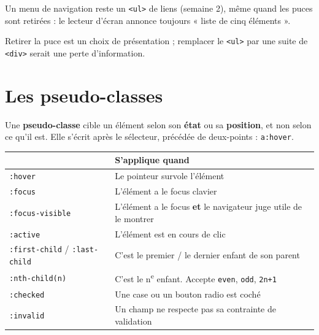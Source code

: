 \documentclass[a4paper,11pt]{article}
\newcommand{\hdr}[1]{\multicolumn{1}{l}{\color{white}\bfseries #1}}
\renewcommand{\arraystretch}{1.3}
\begin{document}
\begin{tcolorbox}[attention, title={\texttt{list-style: none} enlève la puce, pas la sémantique}]
Un menu de navigation reste un \texttt{<ul>} de liens (semaine 2), même quand les puces sont retirées : le lecteur d'écran annonce toujours « liste de cinq éléments ».

\vspace{3pt}
Retirer la puce est un choix de présentation ; remplacer le \texttt{<ul>} par une suite de \texttt{<div>} serait une perte d'information.
\end{tcolorbox}

\section{Les pseudo-classes}

\begin{tcolorbox}[definition, title={Définition --- Pseudo-classe}]
Une \textbf{pseudo-classe} cible un élément selon son \textbf{état} ou sa \textbf{position}, et non selon ce qu'il est. Elle s'écrit après le sélecteur, précédée de deux-points : \texttt{a:hover}.
\end{tcolorbox}

\begin{center}
\renewcommand{\arraystretch}{1.0}
\begin{tabularx}{\linewidth}{p{3.4cm}X}
  \toprule
  \rowcolor{uniNavy}
  \hdr{Pseudo-classe} & \hdr{S'applique quand} \\
  \midrule
  \rowcolor{uniPaper}
  \texttt{:hover} & Le pointeur survole l'élément \\
  \texttt{:focus} & L'élément a le focus clavier \\
  \rowcolor{uniPaper}
  \texttt{:focus-visible} & L'élément a le focus \textbf{et} le navigateur juge utile de le montrer \\
  \texttt{:active} & L'élément est en cours de clic \\
  \rowcolor{uniPaper}
  \texttt{:first-child} / \texttt{:last-child} & C'est le premier / le dernier enfant de son parent \\
  \texttt{:nth-child(n)} & C'est le n\textsuperscript{e} enfant. Accepte \texttt{even}, \texttt{odd}, \texttt{2n+1} \\
  \rowcolor{uniPaper}
  \texttt{:checked} & Une case ou un bouton radio est coché \\
  \texttt{:invalid} & Un champ ne respecte pas sa contrainte de validation \\
  \bottomrule
\end{tabularx}
\end{center}
\end{document}
